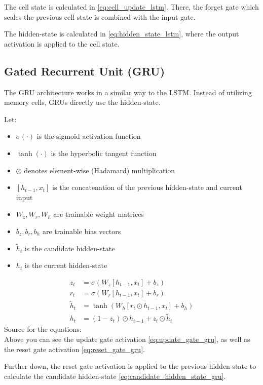 \documentclass{article}
\begin{document}
The cell state is calculated in \eqref{eq:cell_update_lstm}. There, the forget gate which scales the previous cell state is combined with the input gate.

The hidden-state is calculated in \eqref{eq:hidden_state_lstm}, where the output activation is applied to the cell state.

\subsection{Gated Recurrent Unit (GRU)}
The GRU architecture works in a similar way to the LSTM. Instead of utilizing memory cells, GRUs directly use the hidden-state.

Let:
\begin{itemize}
    \item $\sigma(\cdot)$ is the sigmoid activation function
    \item $\tanh(\cdot)$ is the hyperbolic tangent function
    \item $\odot$ denotes element-wise (Hadamard) multiplication
    \item $[h_{t-1}, x_t]$ is the concatenation of the previous hidden-state and current input
    \item $W_z, W_r, W_h$ are trainable weight matrices
    \item $b_z, b_r, b_h$ are trainable bias vectors
    \item $\tilde{h}_t$ is the candidate hidden-state
    \item $h_t$ is the current hidden-state
\end{itemize}

\begin{align}
    z_t &= \sigma\!\left(W_z [h_{t-1}, x_t] + b_z\right) \label{eq:update_gate_gru} \\
    r_t &= \sigma\!\left(W_r [h_{t-1}, x_t] + b_r\right) \label{eq:reset_gate_gru} \\
    \tilde{h}_t &= \tanh\!\left(W_h [r_t \odot h_{t-1}, x_t] + b_h\right) \label{eq:candidate_hidden_state_gru} \\
    h_t &= (1 - z_t) \odot h_{t-1} + z_t \odot \tilde{h}_t \label{eq:update_hidden_state_gru}
\end{align}
Source for the equations: \cite{geeksforgeeks_gru}
\\[2em]
Above you can see the update gate activation \eqref{eq:update_gate_gru}, as well as the reset gate activation \eqref{eq:reset_gate_gru}.

Further down, the reset gate activation is applied to the previous hidden-state to calculate the candidate hidden-state \eqref{eq:candidate_hidden_state_gru}. 
\end{document}

